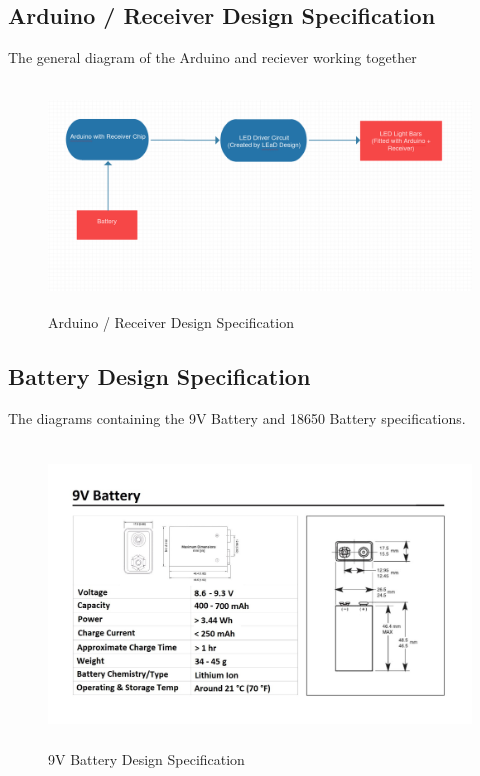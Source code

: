 \documentclass[12pt]{article}
\begin{document}
{{{{		\subsection{Arduino / Receiver Design Specification}
			The general diagram of the Arduino and reciever working together
			\begin{figure}[!htb]
				\centering
				\includegraphics[width = 140mm, height = 60mm]{assets/Arduino_Receiver_Diagram.png}
				\caption{Arduino / Receiver Design Specification \label{overflow}}
			\end{figure}
		
		\subsection{Battery Design Specification}
			The diagrams containing the 9V Battery and 18650 Battery specifications.
			\begin{figure}[!htb]
				\centering
				\includegraphics[width = 140mm, height = 80mm]{assets/9V_Battery.jpg}
				\caption{9V Battery Design Specification \label{overflow}}
			\end{figure}
			
}}}}
\end{document}
